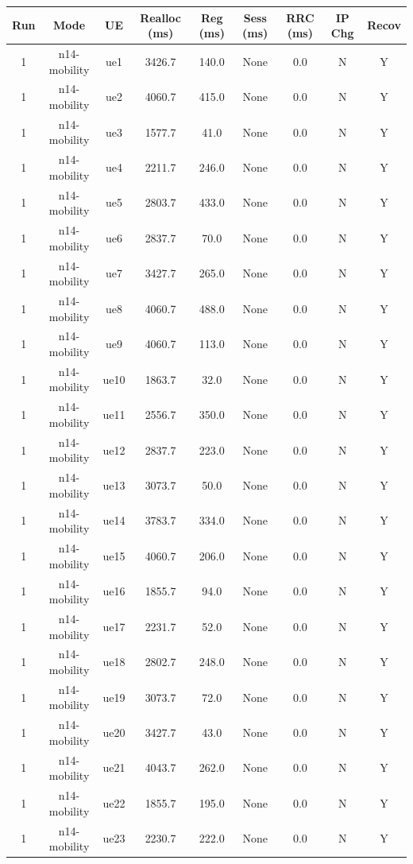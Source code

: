 \begin{table}[ht]
\centering
\begin{tabular}{|c|c|c|c|c|c|c|c|c|}
\hline
Run & Mode & UE & Realloc (ms) & Reg (ms) & Sess (ms) & RRC (ms) & IP Chg & Recov \\
\hline
1 & n14-mobility & ue1 & 3426.7 & 140.0 & None & 0.0 & N & Y \\
1 & n14-mobility & ue2 & 4060.7 & 415.0 & None & 0.0 & N & Y \\
1 & n14-mobility & ue3 & 1577.7 & 41.0 & None & 0.0 & N & Y \\
1 & n14-mobility & ue4 & 2211.7 & 246.0 & None & 0.0 & N & Y \\
1 & n14-mobility & ue5 & 2803.7 & 433.0 & None & 0.0 & N & Y \\
1 & n14-mobility & ue6 & 2837.7 & 70.0 & None & 0.0 & N & Y \\
1 & n14-mobility & ue7 & 3427.7 & 265.0 & None & 0.0 & N & Y \\
1 & n14-mobility & ue8 & 4060.7 & 488.0 & None & 0.0 & N & Y \\
1 & n14-mobility & ue9 & 4060.7 & 113.0 & None & 0.0 & N & Y \\
1 & n14-mobility & ue10 & 1863.7 & 32.0 & None & 0.0 & N & Y \\
1 & n14-mobility & ue11 & 2556.7 & 350.0 & None & 0.0 & N & Y \\
1 & n14-mobility & ue12 & 2837.7 & 223.0 & None & 0.0 & N & Y \\
1 & n14-mobility & ue13 & 3073.7 & 50.0 & None & 0.0 & N & Y \\
1 & n14-mobility & ue14 & 3783.7 & 334.0 & None & 0.0 & N & Y \\
1 & n14-mobility & ue15 & 4060.7 & 206.0 & None & 0.0 & N & Y \\
1 & n14-mobility & ue16 & 1855.7 & 94.0 & None & 0.0 & N & Y \\
1 & n14-mobility & ue17 & 2231.7 & 52.0 & None & 0.0 & N & Y \\
1 & n14-mobility & ue18 & 2802.7 & 248.0 & None & 0.0 & N & Y \\
1 & n14-mobility & ue19 & 3073.7 & 72.0 & None & 0.0 & N & Y \\
1 & n14-mobility & ue20 & 3427.7 & 43.0 & None & 0.0 & N & Y \\
1 & n14-mobility & ue21 & 4043.7 & 262.0 & None & 0.0 & N & Y \\
1 & n14-mobility & ue22 & 1855.7 & 195.0 & None & 0.0 & N & Y \\
1 & n14-mobility & ue23 & 2230.7 & 222.0 & None & 0.0 & N & Y \\

\end{tabular}
\end{table}
